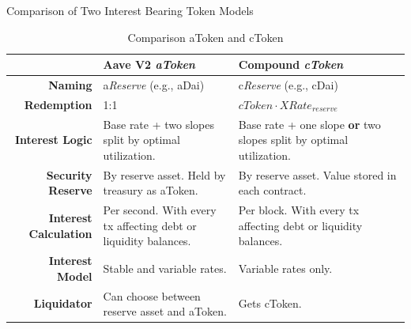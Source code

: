 \documentclass[handout]{beamer}
\begin{document}
\begin{frame}{Comparison of Two Interest Bearing Token Models}

\footnotesize
\begin{table}
  \center
  \begin{tabularx}{\textwidth}{rXX}
    \toprule
    ~	& \textbf{Aave V2} \emph{aToken} & \textbf{Compound} \emph{cToken}	\\
    \midrule
    \textbf{Naming} & a\textit{Reserve} (e.g., aDai) & c\textit{Reserve} (e.g., cDai) \vspace{0.5em}\\
    \textbf{Redemption} & 1:1 & $cToken \cdot XRate_{reserve}$ \vspace{0.5em}\\
    \textbf{Interest Logic} & Base rate + two slopes split by optimal utilization. & Base rate + one slope \textbf{or} two slopes split by optimal utilization. \vspace{0.5em}\\
    \textbf{Security Reserve} & By reserve asset. Held by treasury as aToken. & By reserve asset. Value stored in each contract. \vspace{0.5em}\\
    \textbf{Interest Calculation} & Per second. With every tx affecting debt or liquidity balances. & Per block. With every tx affecting debt or liquidity balances. \vspace{0.5em}\\
    \textbf{Interest Model} & Stable and variable rates. & Variable rates only. \vspace{0.5em}\\
    \textbf{Liquidator} & Can choose between reserve asset and aToken. & Gets cToken.\\
    \bottomrule
  \end{tabularx}
  \caption{Comparison aToken and cToken \cite{AaveV2,Compound}}
\end{table}

\end{frame}
\end{document}
